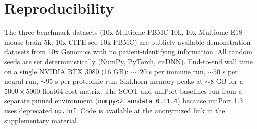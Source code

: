\documentclass{article}
\theoremstyle{plain}
\begin{document}
\section{Reproducibility}
\label{app:repro}

The three benchmark datasets (10x Multiome PBMC 10k, 10x Multiome E18 mouse brain 5k, 10x CITE-seq 10k PBMC) are publicly available demonstration datasets from 10x Genomics with no patient-identifying information. All random seeds are set deterministically (NumPy, PyTorch, cuDNN). End-to-end wall time on a single NVIDIA RTX 3080 (16 GB): ${\sim}120$ s per immune run, ${\sim}50$ s per neural run, ${\sim}95$ s per proteomic run; Sinkhorn memory peaks at ${\sim}8$ GB for a $5000\times 5000$ float64 cost matrix. The SCOT and uniPort baselines run from a separate pinned environment (\texttt{numpy<2}, \texttt{anndata 0.11.4}) because uniPort 1.3 uses deprecated \texttt{np.Inf}. Code is available at the anonymized link in the supplementary material.
\end{document}
